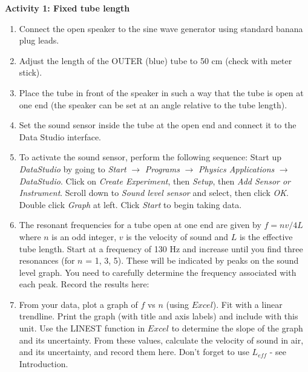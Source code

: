 {\noindent \bf Activity 1: Fixed tube length} \begin{enumerate}

\item Connect the open speaker to the sine wave generator using standard banana plug leads.

\item Adjust the length of the OUTER (blue) tube to 50 cm (check with meter stick).

\item Place the tube in front of the speaker in such a way that the tube is open at one end (the speaker can be set at an angle relative to the tube length).

\item Set the sound sensor inside the tube at the open end and connect it to the Data Studio interface.

\item To activate the sound sensor, perform the following sequence:  Start up \textit{DataStudio} by going to \textit{Start} $\rightarrow$ \textit{Programs} $\rightarrow$ \textit{Physics Applications} $\rightarrow$ \textit{DataStudio}.
Click on \textit{Create Experiment}, then \textit{Setup}, then \textit{Add Sensor or Instrument}. Scroll down to \textit{Sound level sensor} and select, then click \textit{OK}. Double click \textit{Graph} at left. Click \textit{Start} to begin taking data.

\item The resonant frequencies for a tube open at one end are given by $f=nv/4L$ where $n$ is an odd integer, $v$ is the velocity of sound and $L$ is the effective tube length. Start at a frequency of 130 Hz and increase until you find three resonances (for $n$ = 1, 3, 5). These will be indicated by peaks on the sound level graph. You need to carefully determine the frequency associated with each peak.  Record the results here:\vspace{10mm}

\item From your data, plot a graph of $f$ vs $n$ (using $Excel$). Fit with a linear trendline. Print the graph (with title and axis labels) and include with this unit. Use the LINEST function in $Excel$ to determine the slope of the graph and its uncertainty. From these values, calculate the velocity of sound in air, and its uncertainty, and record them here. Don't forget to use $L_{eff}$ - see Introduction.
\vspace{12mm}

\end{enumerate}

